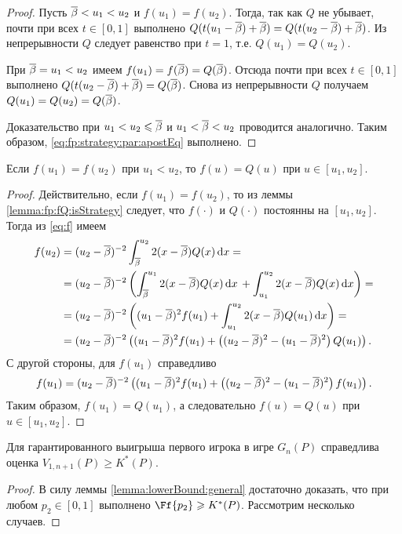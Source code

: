 {\begin{proof}
  Пусть ${\overline{\beta}} < u_1 < u_2$ и $f(u_1) = f(u_2)$. Тогда, так как $Q$ не убывает, почти при всех
  $t \in [0, 1]$ выполнено
  $ Q(t(u_1 - {\overline{\beta}}) + {\overline{\beta}}) = Q(t(u_2 - {\overline{\beta}}) + {\overline{\beta}})$. Из непрерывности
  $Q$ следует равенство при $t = 1$, т.е. $Q(u_1) = Q(u_2)$.

  При ${\overline{\beta}} = u_1 < u_2$ имеем $f(u_1) = f({\overline{\beta}}) = Q({\overline{\beta}})$. Отсюда почти
  при всех $t \in [0, 1]$ выполнено $Q(t(u_2 - {\overline{\beta}}) + {\overline{\beta}}) = Q({\overline{\beta}})$.
  Снова из непрерывности $Q$ получаем $Q(u_1) = Q(u_2) = Q({\overline{\beta}})$.

  Доказательство при $u_1 < u_2 \leqslant {\overline{\beta}}$ и $u_1 < {\overline{\beta}} < u_2$ проводится аналогично.
  Таким образом, \eqref{eq:fp:strategy:par:apostEq} выполнено.
\end{proof}

\begin{lemma}
  \label{lemma:f=Q}
  Если $f(u_1) = f(u_2)$ при $u_1 < u_2$, то $f(u) = Q(u)$ при $u \in [u_1, u_2]$.
\end{lemma}
\begin{proof}
  Действительно, если $f(u_1) = f(u_2)$, то из леммы \ref{lemma:fp:fQ:isStrategy} следует, что $f(\cdot)$ и $Q(\cdot)$ постоянны на $[u_1, u_2]$.
  Тогда из \eqref{eq:f} имеем
  \begin{align*}
    f(u_2)
    &= (u_2 - {\overline{\beta}})^{-2} \int_{{\overline{\beta}}}^{u_2} 2 (x - {\overline{\beta}}) Q(x) \mathop{}\!\mathrm{d} x = \\
    &= (u_2 - {\overline{\beta}})^{-2} \left(
      \int_{{\overline{\beta}}}^{u_1} 2 (x - {\overline{\beta}}) Q(x) \mathop{}\!\mathrm{d} x \, +
      \int_{u_1}^{u_2} 2 (x - {\overline{\beta}}) Q(x) \mathop{}\!\mathrm{d} x
      \right) = \\
    &= (u_2 - {\overline{\beta}})^{-2} \left(
      (u_1 - {\overline{\beta}})^2 f(u_1) +
      \int_{u_1}^{u_2} 2 (x - {\overline{\beta}}) Q(u_1) \mathop{}\!\mathrm{d} x
      \right) = \\
    &= (u_2 - {\overline{\beta}})^{-2} \left(
      (u_1 - {\overline{\beta}})^2 f(u_1) +
      \left( (u_2 - {\overline{\beta}})^2 - (u_1 - {\overline{\beta}})^2 \right) Q(u_1)
      \right).
  \end{align*}
  С другой стороны, для $f(u_1)$ справедливо
  \begin{equation*}
    f(u_1) = (u_2 - {\overline{\beta}})^{-2} \left(
      (u_1 - {\overline{\beta}})^2 f(u_1) +
      \left( (u_2 - {\overline{\beta}})^2 - (u_1 - {\overline{\beta}})^2 \right) f(u_1)
    \right).
  \end{equation*}
  Таким образом, $f(u_1) = Q(u_1)$, а следовательно $f(u) = Q(u)$ при
  $u \in [u_1, u_2]$.
\end{proof}

\begin{theorem}\label{theorem:V:bound}
  Для гарантированного выигрыша первого игрока в игре $G_n(P)$ справедлива оценка
  $V_{1,n+1}(P) \geqslant K^*(P).$
\end{theorem}
\begin{proof}
  В силу леммы \ref{lemma:lowerBound:general} достаточно доказать,
  что при любом $p_2 \in [0, 1]$ выполнено $\Ff{p_2} \geqslant K^*(P)$.
  Рассмотрим несколько случаев.


\end{proof}}
